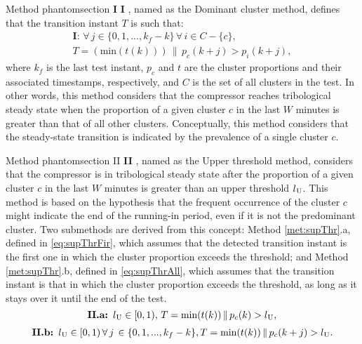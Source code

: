 \documentclass[preprint,11pt,number]{elsarticle}
\makeatletter
\newcommand{\labeltext}[3][]{%
    \@bsphack%
    \csname phantomsection\endcsname%
    \def\tst{#1}%
    \def\labelmarkup{}%
    \def\refmarkup{}%
    \ifx\tst\empty\def\@currentlabel{\refmarkup{#2}}{\label{#3}}%
    \else\def\@currentlabel{\refmarkup{#1}}{\label{#3}}\fi%
    \@esphack%
    \labelmarkup{#2}%
}
\makeatother
\begin{document}
Method \labeltext[\textbf{I}]{\textbf{I}}{met:dom}, named as the Dominant cluster method, defines that the transition instant $T$ is such that:
\begin{equation}
\begin{gathered}
    \textbf{I: } \forall\, j \in \{0, 1, ..., k_f-k\} \,\forall\, i \in C-\{c\},\\ T = (\text{min}(t(k)))\,\|\,p_c(k+j)>p_i(k+j),
\end{gathered}
\end{equation}
\noindent where $k_f$ is the last test instant, $p_c$ and $t$ are the cluster proportions and their associated timestamps, respectively, and $C$ is the set of all clusters in the test. In other words, this method considers that the compressor reaches tribological steady state when the proportion of a given cluster $c$ in the last $W$ minutes is greater than that of all other clusters. Conceptually, this method considers that the steady-state transition is indicated by the prevalence of a single cluster $c$.

Method \labeltext[II]{\textbf{II}}{met:supThr}, named as the Upper threshold method, considers that the compressor is in tribological steady state after the proportion of a given cluster $c$ in the last $W$ minutes is greater than an upper threshold $l\textsubscript{U}$. This method is based on the hypothesis that the frequent occurrence of the cluster $c$ might indicate the end of the running-in period, even if it is not the predominant cluster. Two submethods are derived from this concept: Method \ref{met:supThr}.a, defined in \eqref{eq:supThrFir}, which assumes that the detected transition instant is the first one in which the cluster proportion exceeds the threshold; and Method \ref{met:supThr}.b, defined in \eqref{eq:supThrAll}, which assumes that the transition instant is that in which the cluster proportion exceeds the threshold, as long as it stays over it until the end of the test.
%
\begin{equation}\label{eq:supThrFir}
    \textbf{II.a: } l\textsubscript{U} \in [0,1), \, T = \text{min}(t(k))\, \| \, p_c(k)>l\textsubscript{U},
\end{equation}
%
\begin{equation}\label{eq:supThrAll}
\begin{gathered}
    \textbf{II.b: } l\textsubscript{U} \in [0,1) \,\forall\, j\, \in \{0, 1, ..., k_f-k\}, T = \text{min}(t(k))\,\|\,p_c(k+j)>l\textsubscript{U}.
\end{gathered}
\end{equation}
\end{document}
